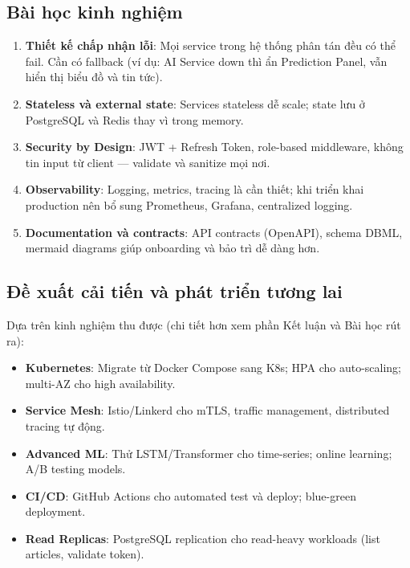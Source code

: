 \subsection{Bài học kinh nghiệm}

\begin{enumerate}
    \item \textbf{Thiết kế chấp nhận lỗi}: Mọi service trong hệ thống phân tán đều có thể fail. Cần có fallback (ví dụ: AI Service down thì ẩn Prediction Panel, vẫn hiển thị biểu đồ và tin tức).
    
    \item \textbf{Stateless và external state}: Services stateless dễ scale; state lưu ở PostgreSQL và Redis thay vì trong memory.
    
    \item \textbf{Security by Design}: JWT + Refresh Token, role-based middleware, không tin input từ client --- validate và sanitize mọi nơi.
    
    \item \textbf{Observability}: Logging, metrics, tracing là cần thiết; khi triển khai production nên bổ sung Prometheus, Grafana, centralized logging.
    
    \item \textbf{Documentation và contracts}: API contracts (OpenAPI), schema DBML, mermaid diagrams giúp onboarding và bảo trì dễ dàng hơn.
\end{enumerate}

\subsection{Đề xuất cải tiến và phát triển tương lai}

Dựa trên kinh nghiệm thu được (chi tiết hơn xem phần Kết luận và Bài học rút ra):
\begin{itemize}
    \item \textbf{Kubernetes}: Migrate từ Docker Compose sang K8s; HPA cho auto-scaling; multi-AZ cho high availability.
    \item \textbf{Service Mesh}: Istio/Linkerd cho mTLS, traffic management, distributed tracing tự động.
    \item \textbf{Advanced ML}: Thử LSTM/Transformer cho time-series; online learning; A/B testing models.
    \item \textbf{CI/CD}: GitHub Actions cho automated test và deploy; blue-green deployment.
    \item \textbf{Read Replicas}: PostgreSQL replication cho read-heavy workloads (list articles, validate token).
\end{itemize}


